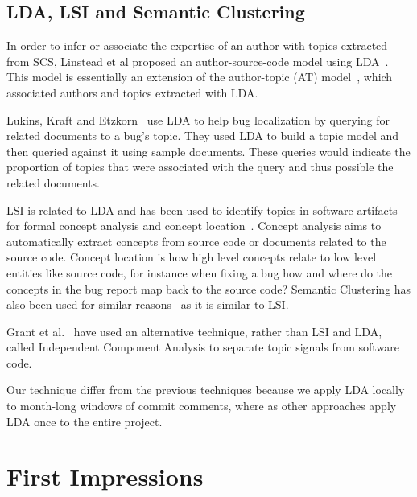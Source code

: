 \documentclass[times, 10pt,twocolumn]{article}
\begin{document}
\subsection{LDA, LSI and Semantic Clustering}

In order to infer or associate the expertise of an author with topics
extracted from SCS, Linstead et al proposed an author-source-code model
using LDA~\cite{10.1109/MSR.2007.20,NIPS2007637,1321709}. This model
is essentially an extension of the author-topic (AT)
model~\cite{1036902}, which associated authors and topics extracted
with LDA.

Lukins, Kraft and Etzkorn~\cite{lukins2008} use LDA to help bug
localization by querying for related documents to a bug's topic. They
used LDA to build a topic model and then queried against it using
sample documents. These queries would indicate the proportion of
topics that were associated with the query and thus possible the
related documents.

LSI is related to LDA and has been used to identify topics in software
artifacts for formal concept analysis and concept
location~\cite{1421013,1374321,10.1109/ICPC.2007.13,10.1109/ICPC.2006.17}.
Concept analysis aims to automatically extract concepts from source
code or documents related to the source code.  Concept location is how
high level concepts relate to low level entities like source code, for
instance when fixing a bug how and where do the concepts in the bug
report map back to the source code?  Semantic Clustering has also been
used for similar reasons~\cite{1698774,1566153} as it is similar to
LSI.

Grant et al.~\cite{scottcordy} have used an alternative technique,
rather than LSI and LDA, called Independent Component Analysis to
separate topic signals from software code. 

Our technique differ from the previous techniques because we apply LDA
locally to month-long windows of commit comments, where as other
approaches apply LDA once to the entire project.




\section{First Impressions}
\end{document}
